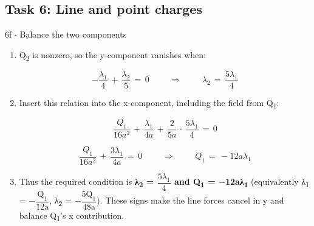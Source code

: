 \documentclass[11pt]{article}
\begin{document}
\begin{keepsection}\subsection{Task 6: Line and point charges}

\begin{workedbox}{6f \ensuremath{\cdot} Balance the two components}
\begin{enumerate}
\item {}
Q\textsubscript{2} is nonzero, so the y-component vanishes when:

\begin{equation*}-\dfrac{λ_{1}}{4}\, +\, \dfrac{λ_{2}}{5}\, =\, 0\, \quad \, \quad \Rightarrow \quad \, \quad \, λ_{2}\, =\, \dfrac{5λ_{1}}{4}\end{equation*}
\item {}
Insert this relation into the x-component, including the field from Q\textsubscript{1}:

\begin{equation*}\dfrac{{Q}_{1}}{16{a}^{2}}\, +\, \dfrac{λ_{1}}{4{a}}\, +\, \dfrac{2}{5{a}}\, \cdot \, \dfrac{5λ_{1}}{4}\, =\, 0\end{equation*}

\begin{equation*}\dfrac{{Q}_{1}}{16{a}^{2}}\, +\, \dfrac{3λ_{1}}{4{a}}\, =\, 0\, \quad \, \quad \Rightarrow \quad \, \quad \, {Q}_{1}\, =\, -12{a}λ_{1}\end{equation*}
\item Thus the required condition is \textbf{λ\textsubscript{2} = {\small\ensuremath{\dfrac{5λ_{1}}{4}}} and Q\textsubscript{1} = \ensuremath{-}12aλ\textsubscript{1}} (equivalently λ\textsubscript{1} = \ensuremath{-}{\small\ensuremath{\dfrac{\mathrm{Q}_{1}}{12\mathrm{a}}}}, λ\textsubscript{2} = \ensuremath{-}{\small\ensuremath{\dfrac{5\mathrm{Q}_{1}}{48\mathrm{a}}}}). These signs make the line forces cancel in y and balance Q\textsubscript{1}’s x contribution.
\end{enumerate}
\end{workedbox}

\end{keepsection}
\end{document}
